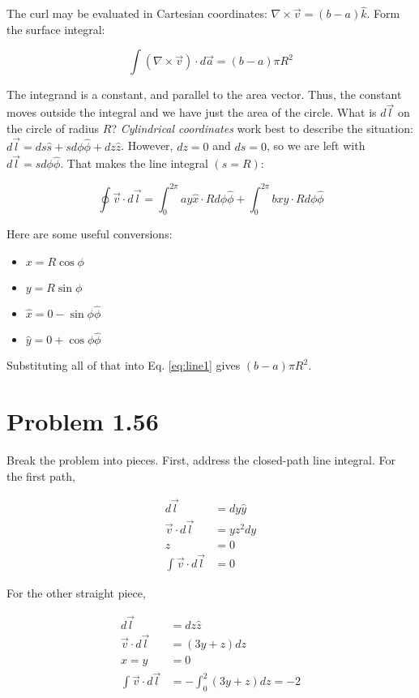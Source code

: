 \documentclass[10pt]{article}
\begin{document}
The curl may be evaluated in Cartesian coordinates: $\nabla \times \vec{v} = (b-a)\hat{k}$.  Form the surface integral:

\begin{equation}
\int (\nabla \times \vec{v}) \cdot d\vec{a} = (b-a) \pi R^2
\end{equation}

The integrand is a constant, and parallel to the area vector.  Thus, the constant moves outside the integral and we have just the area of the circle.  What is $d\vec{l}$ on the circle of radius $R$?  \textit{Cylindrical coordinates} work best to describe the situation: $d\vec{l} = ds \hat{s} + s d\phi \hat{\phi} + dz \hat{z}$.  However, $dz = 0$ and $ds = 0$, so we are left with $d\vec{l} = s d\phi \hat{\phi}$.  That makes the line integral $(s = R)$:

\begin{equation}
\oint \vec{v} \cdot d\vec{l} = \int_0^{2\pi} ay \hat{x} \cdot R d\phi \hat{\phi} + \int_0^{2\pi} bx \hat{y} \cdot R d\phi \hat{\phi} \label{eq:line1}
\end{equation}

Here are some useful conversions:
\begin{itemize}
\item $x = R\cos\phi$
\item $y = R\sin\phi$
\item $\hat{x} = 0 - \sin\phi \hat{\phi}$
\item $\hat{y} = 0 + \cos\phi \hat{\phi}$
\end{itemize}
Substituting all of that into Eq. \ref{eq:line1} gives $(b-a) \pi R^2$.

\clearpage

\section{Problem 1.56}

Break the problem into pieces.  First, address the closed-path line integral.  For the first path,

\begin{align}
d\vec{l} &= dy \hat{y} \\
\vec{v} \cdot d\vec{l} &= y z^2 dy \\
z &= 0 \\
\int \vec{v} \cdot d\vec{l} &= 0
\end{align}

For the other straight piece,

\begin{align}
d\vec{l} &= dz \hat{z} \\
\vec{v} \cdot d\vec{l} &= (3y + z) dz \\
x = y &= 0 \\
\int \vec{v} \cdot d\vec{l} &= -\int_0^{2} (3y+z) dz = -2
\end{align}
\end{document}
